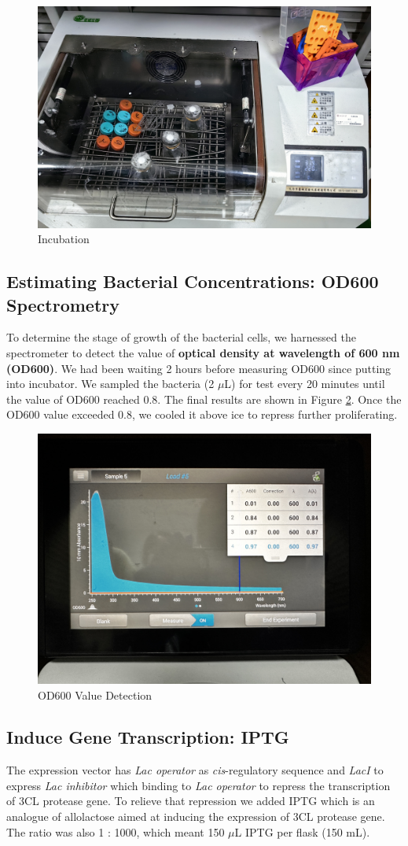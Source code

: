\documentclass{article}
\begin{document}
\begin{figure}
    \centering
    \includegraphics[width=0.5\linewidth]{../Figures/Incubation.png}
    \caption{Incubation}
    \label{Incubation}
\end{figure}
\subsection{Estimating Bacterial Concentrations: OD600 Spectrometry}
To determine the stage of growth of the bacterial cells, we harnessed the spectrometer to detect the value of \textbf{optical density at wavelength of 600 nm (OD600)}. 
We had been waiting 2 hours before measuring OD600 since putting into incubator. We sampled the bacteria (2 $\mu$L) for test every 20 minutes until the value of OD600 reached 0.8. 
The final results are shown in Figure \ref{OD600 Value Detection}.
Once the OD600 value exceeded 0.8, we cooled it above ice to repress further proliferating.

\begin{figure}
    \centering
    \includegraphics[width=0.7\linewidth]{../Figures/OD600.jpg}
    \caption{OD600 Value Detection}
    \label{OD600 Value Detection}
\end{figure}

\subsection{Induce Gene Transcription: IPTG}
The expression vector has \textit{Lac operator} as \textit{cis}-regulatory sequence and \textit{LacI} to express \textit{Lac inhibitor} which binding to \textit{Lac operator} to repress the transcription of 3CL protease gene.
To relieve that repression we added IPTG which is an analogue of allolactose aimed at inducing the expression of 3CL protease gene. 
The ratio was also 1 : 1000, which meant 150 $\mu$L IPTG per flask (150 mL).
\end{document}
